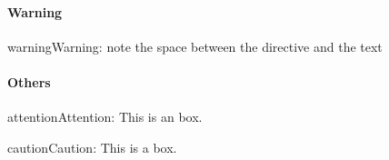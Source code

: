 \begin{sphinxVerbatim}[commandchars=\\\{\}]
       
\end{sphinxVerbatim}


\paragraph{Warning}
\label{\detokenize{lesson/doc/rst:warning}}
\begin{sphinxadmonition}{warning}{Warning:}
note the space between the directive and the text
\end{sphinxadmonition}

\begin{sphinxVerbatim}[commandchars=\\\{\}]
          
\end{sphinxVerbatim}


\paragraph{Others}
\label{\detokenize{lesson/doc/rst:others}}
\begin{sphinxadmonition}{attention}{Attention:}
This is an  box.
\end{sphinxadmonition}

\begin{sphinxVerbatim}[commandchars=\\\{\}]
      
\end{sphinxVerbatim}

\begin{sphinxadmonition}{caution}{Caution:}
This is a  box.
\end{sphinxadmonition}

\begin{sphinxVerbatim}[commandchars=\\\{\}]
      
\end{sphinxVerbatim}

